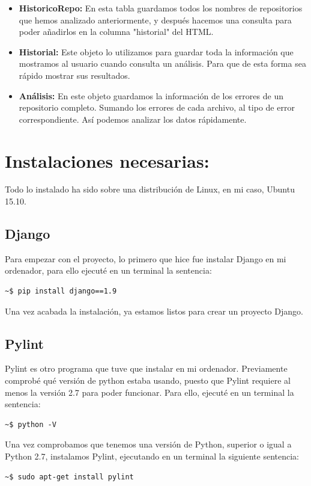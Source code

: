 \documentclass[a4paper, 12pt]{book}
\begin{document}
\begin{itemize}
\item \textbf{HistoricoRepo: }En esta tabla guardamos todos los nombres de repositorios que hemos analizado anteriormente, y después hacemos una consulta para poder añadirlos en la columna "historial" del HTML.
\item \textbf{Historial: } Este objeto lo utilizamos para guardar toda la información que mostramos al usuario cuando consulta un análisis. Para que de esta forma sea rápido mostrar sus resultados.
\item \textbf{Análisis: } En este objeto guardamos la información de los errores de un repositorio completo. Sumando los errores de cada archivo, al tipo de error correspondiente. Así podemos analizar los datos rápidamente.

\end{itemize}

\section{Instalaciones necesarias: } 
Todo lo instalado ha sido sobre una distribución de Linux, en mi caso, Ubuntu 15.10.
\subsection{Django}
Para empezar con el proyecto, lo primero que hice fue instalar Django en mi ordenador, para ello ejecuté en un terminal la sentencia: \\
\lstset{language=bash, breaklines=true, basicstyle=\footnotesize}
\begin{lstlisting}[frame=single]
~$ pip install django==1.9
\end{lstlisting}
Una vez acabada la instalación, ya estamos listos para crear un proyecto Django.

\subsection{Pylint}
Pylint es otro programa que tuve que instalar en mi ordenador.
Previamente comprobé qué versión de python estaba usando, puesto que Pylint requiere al menos la versión 2.7 para poder funcionar. Para ello, ejecuté en un terminal la sentencia:\\
\lstset{language=bash, breaklines=true, basicstyle=\footnotesize}
\begin{lstlisting}[frame=single]
~$ python -V
\end{lstlisting}
\newpage
Una vez comprobamos que tenemos una versión de Python, superior o igual a Python 2.7, instalamos Pylint, ejecutando en un terminal la siguiente sentencia:\\
\lstset{language=bash, breaklines=true, basicstyle=\footnotesize}
\begin{lstlisting}[frame=single]
~$ sudo apt-get install pylint
\end{lstlisting}
\end{document}
